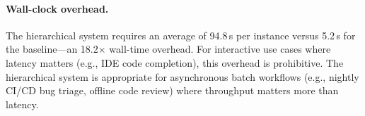 \paragraph{Wall-clock overhead.}
The hierarchical system requires an average of 94.8\,s per instance versus
5.2\,s for the baseline---an 18.2$\times$ wall-time overhead. For
interactive use cases where latency matters (e.g., IDE code completion),
this overhead is prohibitive. The hierarchical system is appropriate for
asynchronous batch workflows (e.g., nightly CI/CD bug triage, offline code
review) where throughput matters more than latency.
